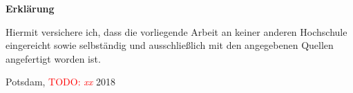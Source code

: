 \documentclass[11pt,DIV=13,BCOR=5mm,a4paper,headinclude]{scrbook}
\newcommand\todo[1]{\textcolor{red}{TODO: \textit{{#1}}}}
\begin{document}

\begingroup
\let\clearpage\relax
\renewcommand*{\chapterheadstartvskip}{\vspace*{-2\baselineskip}}
\begin{small}
 
 
\end{small}
\endgroup



\clearpage
\pagestyle{empty}
\begin{center}
  {\Large\sffamily\bfseries Erklärung}
\end{center}

\vspace{\baselineskip}

Hiermit versichere ich, dass die vorliegende Arbeit an keiner anderen Hochschule eingereicht sowie selbständig und ausschließlich mit den angegebenen Quellen angefertigt worden ist.\\

\begin{flushleft}
  Potsdam, \todo{xx} 2018
\end{flushleft}
\end{document}
